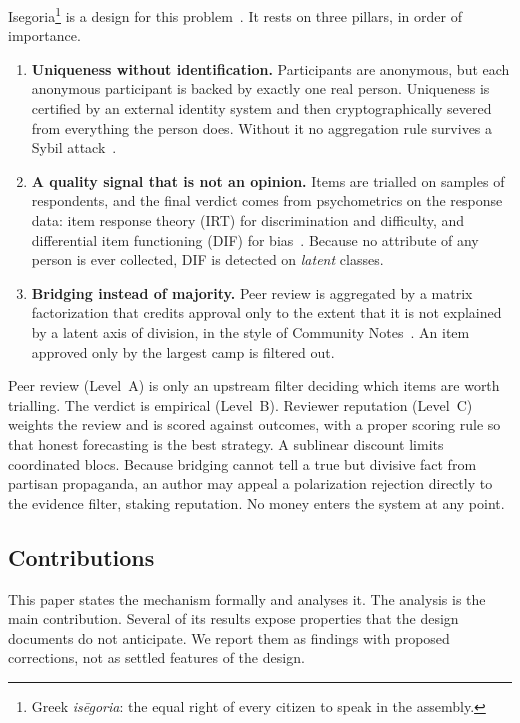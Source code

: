 Isegoria\footnote{Greek \emph{isēgoria}: the equal right of every citizen to speak in the
assembly.} is a design for this problem~\cite{isegoria-repo}. It rests on three pillars, in
order of importance.
\begin{enumerate}
  \item \textbf{Uniqueness without identification.} Participants are anonymous, but each
    anonymous participant is backed by exactly one real person. Uniqueness is certified by an
    external identity system and then cryptographically severed from everything the person
    does. Without it no aggregation rule survives a Sybil attack~\cite{douceur2002sybil}.
  \item \textbf{A quality signal that is not an opinion.} Items are trialled on samples of
    respondents, and the final verdict comes from psychometrics on the response data: item
    response theory (IRT) for discrimination and difficulty, and differential item
    functioning (DIF) for bias~\cite{lord1980,holland1993dif}. Because no attribute of any
    person is ever collected, DIF is detected on \emph{latent} classes.
  \item \textbf{Bridging instead of majority.} Peer review is aggregated by a matrix
    factorization that credits approval only to the extent that it is not explained by a
    latent axis of division, in the style of Community Notes~\cite{wojcik2022birdwatch}. An
    item approved only by the largest camp is filtered out.
\end{enumerate}
Peer review (Level~A) is only an upstream filter deciding which items are worth trialling. The
verdict is empirical (Level~B). Reviewer reputation (Level~C) weights the review and is scored
against outcomes, with a proper scoring rule so that honest forecasting is the best strategy. A
sublinear discount limits coordinated blocs. Because bridging cannot tell a true but divisive
fact from partisan propaganda, an author may appeal a polarization rejection directly to the
evidence filter, staking reputation. No money enters the system at any point.

\subsection{Contributions}

This paper states the mechanism formally and analyses it. The analysis is the main
contribution. Several of its results expose properties that the design documents do not
anticipate. We report them as findings with proposed corrections, not as settled
features of the design.

